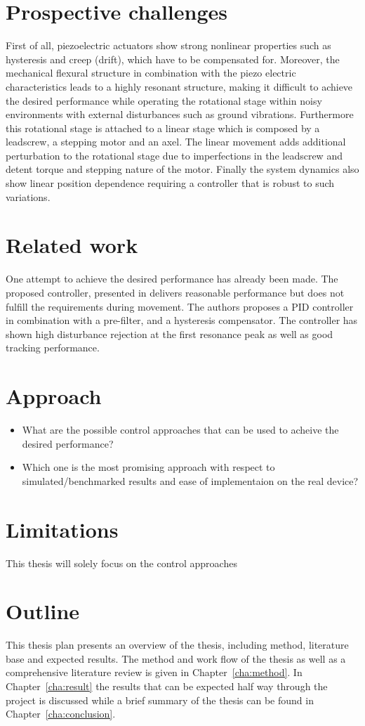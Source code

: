 \section{Prospective challenges}
First of all, piezoelectric  actuators show strong nonlinear properties such as hysteresis and creep (drift), which have to be compensated for. Moreover, the mechanical flexural structure in combination with the piezo electric characteristics leads to a highly resonant structure, making it difficult to achieve the desired performance while operating the rotational stage within noisy environments with external disturbances such as ground vibrations. Furthermore this rotational stage is attached to a linear stage which is composed by a leadscrew, a stepping motor and an axel. The linear movement adds additional perturbation to the rotational stage due to imperfections in the leadscrew and detent torque and stepping nature of the motor. Finally the system dynamics also show linear position dependence requiring a controller that is robust to such variations.

\section{Related work}
One attempt to achieve the desired performance has already been made. The proposed controller, presented in \citep{ButcherController:2015} delivers reasonable performance but does not fulfill the requirements during movement. The authors proposes a PID controller in combination with a pre-filter, and a hysteresis compensator. The controller has shown high disturbance rejection at the first resonance peak as well as good tracking performance.

\section{Approach}

\begin{itemize}
  \item What are the possible control approaches that can be used to acheive the desired performance?
  \item Which one is the most promising approach with respect to simulated/benchmarked results and ease of implementaion on the real device?
\end{itemize}

\section{Limitations}
This thesis will solely focus on the control approaches

\section{Outline}
This thesis plan presents an overview of the thesis, including method, literature base and expected results. The method and work flow of the thesis as well as a comprehensive literature review is given in Chapter~\ref{cha:method}. In Chapter~\ref{cha:result} the results that can be expected half way through the project is discussed while a brief summary of the thesis can be found in Chapter~\ref{cha:conclusion}.
